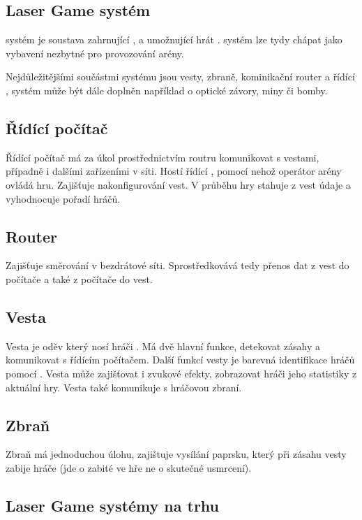 \subsection{Laser Game systém}
 systém je soustava zahrnující ,  a  umožnující hrát .  systém lze tydy chápat jako vybavení nezbytné pro provozování  arény.

Nejdůležitějšími součástmi  systému jsou vesty, zbraně, kominikační router a řídící ,  systém může být dále doplněn například o optické závory, miny či bomby.

\subsection{Řídící počítač}
Řídící počítač má za úkol prostřednictvím routru komunikovat s vestami, případně i dalšími zařízeními v síti. Hostí řídící , pomocí nehož operátor arény ovládá hru. Zajišťuje nakonfigurování vest. V průběhu hry stahuje z vest údaje a vyhodnocuje pořadí hráčů.

\subsection{Router}
Zajišťuje směrování v bezdrátové  síti. Sprostředkovává tedy přenos dat z vest do počítače a také z počítače do vest.

\subsection{Vesta}
Vesta je oděv který nosí hráči . Má dvě hlavní funkce, detekovat zásahy a komunikovat s řídícím počítačem. Další funkcí vesty je barevná identifikace hráčů pomocí  . Vesta může zajišťovat i zvukové efekty, zobrazovat hráči jeho statistiky z aktuální hry. Vesta také komunikuje s hráčovou zbraní.

\subsection{Zbraň}
Zbraň má jednoduchou úlohu, zajištuje vysílání  paprsku, který při zásahu vesty zabije hráče (jde o zabité ve hře ne o skutečné usmrcení).

\subsection{Laser Game systémy na trhu}
